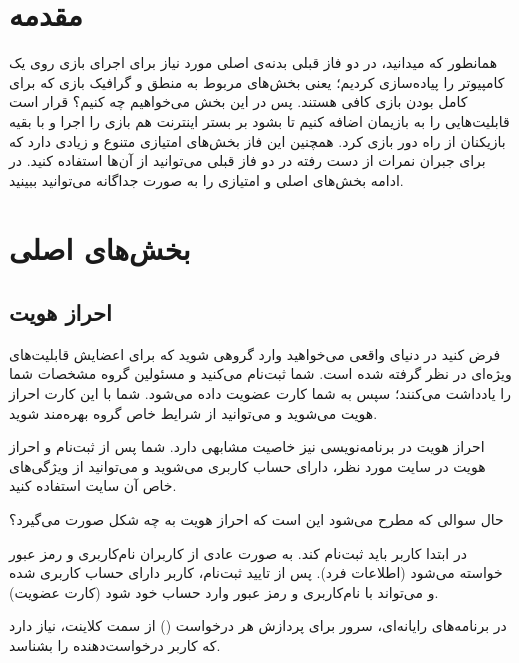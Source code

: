 \documentclass[]{article}
\begin{document}
\newpage

\section*{{\titr مقدمه}}

همانطور که میدانید، در دو فاز قبلی بدنه‌ی اصلی مورد نیاز برای اجرای بازی روی یک کامپیوتر را پیاده‌سازی کردیم؛ یعنی بخش‌های مربوط به منطق و گرافیک بازی که برای کامل بودن بازی کافی هستند. پس در این بخش می‌خواهیم چه کنیم؟ قرار است قابلیت‌هایی را به بازیمان اضافه کنیم تا بشود بر بستر اینترنت هم بازی را اجرا و با بقیه بازیکنان از راه دور بازی کرد. همچنین این فاز بخش‌های امتیازی متنوع و زیادی دارد که برای جبران نمرات از دست‌ رفته در دو فاز قبلی می‌توانید از آن‌ها استفاده کنید. در ادامه بخش‌های اصلی و امتیازی را به صورت جداگانه می‌توانید ببینید.

\section*{{\titr بخش‌های اصلی}}

\subsection*{{\titr احراز هویت}}

فرض کنید در دنیای واقعی می‌خواهید وارد گروهی شوید که برای اعضایش قابلیت‌های ویژه‌ای در نظر گرفته شده است. شما ثبت‌نام می‌کنید و مسئولین گروه مشخصات شما را یادداشت می‌کنند؛ سپس به شما کارت عضویت داده می‌شود. شما با این کارت احراز هویت می‌شوید و می‌توانید از شرایط خاص گروه بهره‌مند شوید.

احراز هویت در برنامه‌نویسی نیز خاصیت مشابهی دارد. شما پس از ثبت‌نام و احراز هویت در سایت مورد نظر، دارای حساب کاربری می‌شوید و می‌توانید از ویژگی‌های خاص آن سایت استفاده کنید.

حال سوالی که مطرح می‌شود این است که احراز هویت به چه شکل صورت می‌گیرد؟

در ابتدا کاربر باید ثبت‌نام کند. به صورت عادی از کاربران نام‌کاربری و رمز عبور خواسته می‌شود (اطلاعات فرد). پس از تایید ثبت‌نام، کاربر دارای حساب کاربری شده و می‌تواند با نام‌کاربری و رمز عبور وارد حساب خود شود (کارت عضویت).

در برنامه‌‌های رایانه‌ای، سرور برای پردازش هر درخواست () از سمت کلاینت، نیاز دارد که کاربر درخواست‌دهنده را بشناسد.
\end{document}
